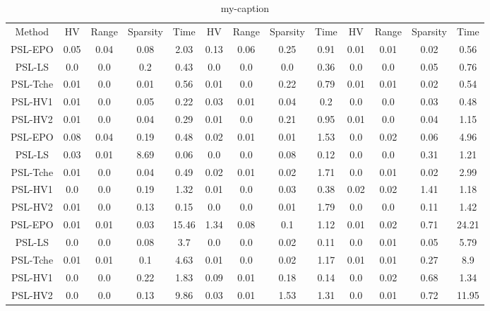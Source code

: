 \begin{table}[]
\centering
\caption{my-caption}
\label{my-label}
\begin{tabular}{ccccccccccccc}
Method  &        HV  &    Range&     Sparsity&        Time &     HV  &    Range&     Sparsity&        Time&    HV  &    Range&     Sparsity&        Time\\
PSL-EPO &        0.05&    0.04 &     0.08    &        2.03 &     0.13&    0.06 &     0.25    &        0.91&    0.01&    0.01 &     0.02    &        0.56\\
PSL-LS  &        0.0 &    0.0  &     0.2     &        0.43 &     0.0 &    0.0  &     0.0     &        0.36&    0.0 &    0.0  &     0.05    &        0.76\\
PSL-Tche&        0.01&    0.0  &     0.01    &        0.56 &     0.01&    0.0  &     0.22    &        0.79&    0.01&    0.01 &     0.02    &        0.54\\
PSL-HV1 &        0.01&    0.0  &     0.05    &        0.22 &     0.03&    0.01 &     0.04    &        0.2 &    0.0 &    0.0  &     0.03    &        0.48\\
PSL-HV2 &        0.01&    0.0  &     0.04    &        0.29 &     0.01&    0.0  &     0.21    &        0.95&    0.01&    0.0  &     0.04    &        1.15\\
PSL-EPO &        0.08&    0.04 &     0.19    &        0.48 &     0.02&    0.01 &     0.01    &        1.53&    0.0 &    0.02 &     0.06    &        4.96\\
PSL-LS  &        0.03&    0.01 &     8.69    &        0.06 &     0.0 &    0.0  &     0.08    &        0.12&    0.0 &    0.0  &     0.31    &        1.21\\
PSL-Tche&        0.01&    0.0  &     0.04    &        0.49 &     0.02&    0.01 &     0.02    &        1.71&    0.0 &    0.01 &     0.02    &        2.99\\
PSL-HV1 &        0.0 &    0.0  &     0.19    &        1.32 &     0.01&    0.0  &     0.03    &        0.38&    0.02&    0.02 &     1.41    &        1.18\\
PSL-HV2 &        0.01&    0.0  &     0.13    &        0.15 &     0.0 &    0.0  &     0.01    &        1.79&    0.0 &    0.0  &     0.11    &        1.42\\
PSL-EPO &        0.01&    0.01 &     0.03    &        15.46&     1.34&    0.08 &     0.1     &        1.12&    0.01&    0.02 &     0.71    &        24.21\\
PSL-LS  &        0.0 &    0.0  &     0.08    &        3.7  &     0.0 &    0.0  &     0.02    &        0.11&    0.0 &    0.01 &     0.05    &        5.79\\
PSL-Tche&        0.01&    0.01 &     0.1     &        4.63 &     0.01&    0.0  &     0.02    &        1.17&    0.01&    0.01 &     0.27    &        8.9\\
PSL-HV1 &        0.0 &    0.0  &     0.22    &        1.83 &     0.09&    0.01 &     0.18    &        0.14&    0.0 &    0.02 &     0.68    &        1.34\\
PSL-HV2 &        0.0 &    0.0  &     0.13    &        9.86 &     0.03&    0.01 &     1.53    &        1.31&    0.0 &    0.01 &     0.72    &        11.95\\


\end{tabular}
\end{table}
